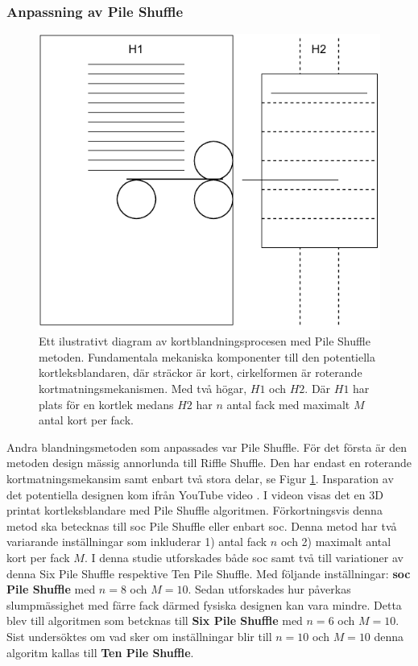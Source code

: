 \documentclass[swedish,a4paper]{article}
\begin{document}
\subsubsection{Anpassning av Pile Shuffle}
\begin{figure}
	\centering
	\includegraphics[width=0.6\linewidth]{irl_pile_shuffle.pdf}
	\captionsetup{width=0.5\textwidth} \caption{Ett ilustrativt diagram av
		kortblandningsprocesen med 
	Pile Shuffle metoden. Fundamentala mekaniska komponenter till den potentiella
	kortleksblandaren, där sträckor är kort, cirkelformen är roterande
kortmatningsmekanismen. Med två högar, $H1$ och $H2$. Där $H1$ har plats för en
kortlek medans $H2$ har $n$ antal fack med maximalt $M$ antal kort per fack.}
	\label{fig:irl_pile}
	
\end{figure}
Andra blandningsmetoden som anpassades var Pile Shuffle.
För det första är den metoden design mässig 
annorlunda till Riffle Shuffle. Den har endast en roterande
kortmatningsmekansim samt enbart två stora delar, se Figur
\ref{fig:irl_pile}. Insparation av det potentiella designen 
kom ifrån YouTube video 
\textcite{3DprintedLife2021}. I videon visas det en 3D printat kortleksblandare med Pile Shuffle algoritmen. Förkortningsvis denna  metod 
ska betecknas till \gls{soc} Pile Shuffle eller enbart 
\gls{soc}. Denna metod har två variarande inställningar som 
inkluderar 1) antal fack $n$ och 2) maximalt antal kort per
fack $M$. I denna studie utforskades både \gls{soc} samt 
två till variationer av denna Six Pile Shuffle respektive 
Ten Pile Shuffle. Med följande inställningar:
\textbf{\gls{soc} Pile Shuffle} med $n = 8$ och $M = 10$. Sedan utforskades hur påverkas slumpmässighet med färre fack
därmed fysiska designen kan vara mindre. Detta blev till 
algoritmen som betcknas till 
\textbf{Six Pile Shuffle} med $n = 6$ och $M = 10$. Sist undersöktes om vad sker om inställningar blir till $n = 10$ och $M = 10$ denna algoritm kallas till
\textbf{Ten Pile Shuffle}.
\end{document}
